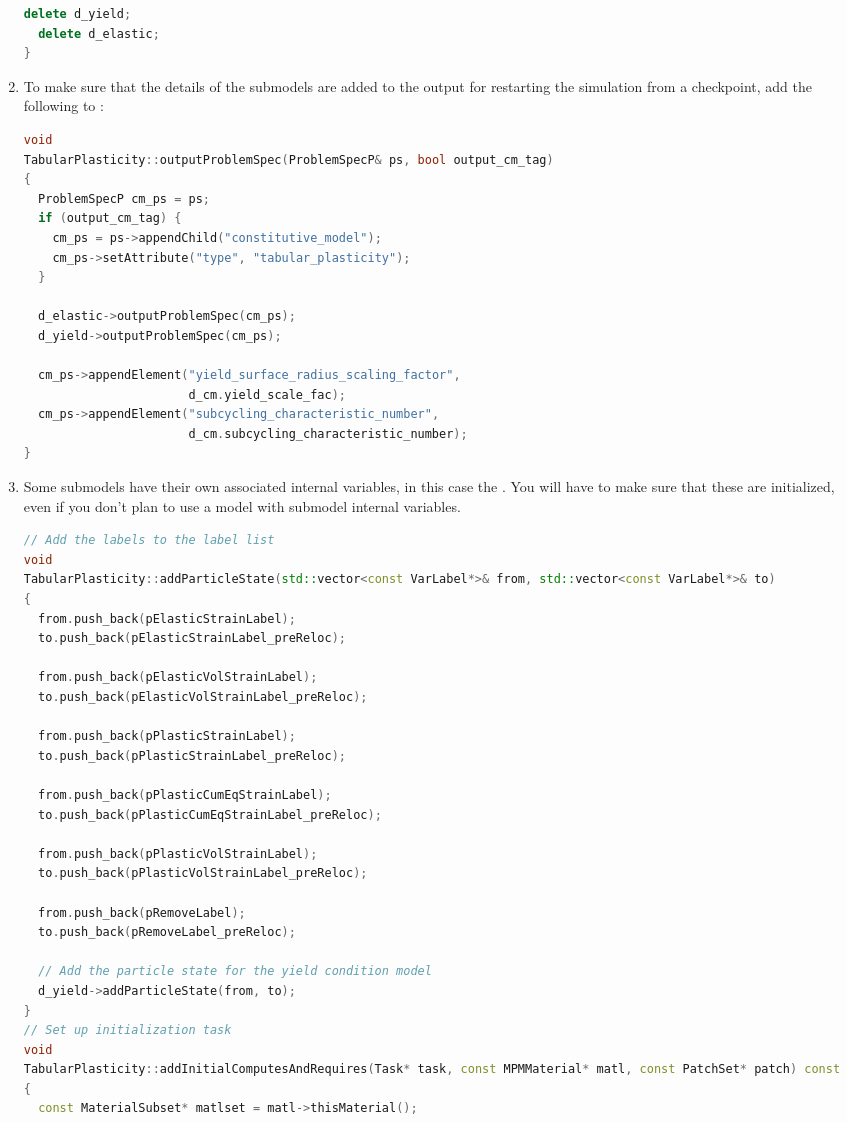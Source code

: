 \begin{enumerate}
\begin{lstlisting}[language=Cpp]
  delete d_yield;
  delete d_elastic;
}
\end{lstlisting}

  \item To make sure that the details of the submodels are added to the output for
        restarting the simulation from a checkpoint, add the
        following to :
\begin{lstlisting}[language=Cpp]
void
TabularPlasticity::outputProblemSpec(ProblemSpecP& ps, bool output_cm_tag)
{
  ProblemSpecP cm_ps = ps;
  if (output_cm_tag) {
    cm_ps = ps->appendChild("constitutive_model");
    cm_ps->setAttribute("type", "tabular_plasticity");
  }

  d_elastic->outputProblemSpec(cm_ps);
  d_yield->outputProblemSpec(cm_ps);

  cm_ps->appendElement("yield_surface_radius_scaling_factor",
                       d_cm.yield_scale_fac);
  cm_ps->appendElement("subcycling_characteristic_number",
                       d_cm.subcycling_characteristic_number);
}
\end{lstlisting}

  \item Some submodels have their own associated internal variables, in this case the 
        .  You will
        have to make sure that these are initialized, even if you don't plan to use a 
        model with submodel internal variables.
\begin{lstlisting}[language=Cpp]
// Add the labels to the label list
void
TabularPlasticity::addParticleState(std::vector<const VarLabel*>& from, std::vector<const VarLabel*>& to)
{
  from.push_back(pElasticStrainLabel);
  to.push_back(pElasticStrainLabel_preReloc);

  from.push_back(pElasticVolStrainLabel);
  to.push_back(pElasticVolStrainLabel_preReloc);

  from.push_back(pPlasticStrainLabel);
  to.push_back(pPlasticStrainLabel_preReloc);

  from.push_back(pPlasticCumEqStrainLabel);
  to.push_back(pPlasticCumEqStrainLabel_preReloc);

  from.push_back(pPlasticVolStrainLabel);
  to.push_back(pPlasticVolStrainLabel_preReloc);

  from.push_back(pRemoveLabel);
  to.push_back(pRemoveLabel_preReloc);

  // Add the particle state for the yield condition model
  d_yield->addParticleState(from, to);
}
// Set up initialization task
void
TabularPlasticity::addInitialComputesAndRequires(Task* task, const MPMMaterial* matl, const PatchSet* patch) const
{
  const MaterialSubset* matlset = matl->thisMaterial();


\end{lstlisting}
\end{enumerate}
